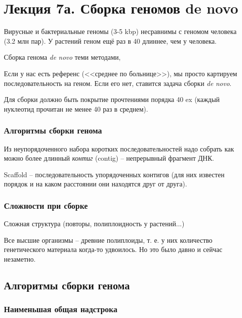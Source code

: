 \documentclass[main.tex]{subfiles}
\begin{document}
\section{Лекция 7а. Сборка геномов de novo}

Вирусные и бактериальные геномы (3-5 kbp) несравнимы с геномом человека (3.2 млн пар).
У растений геном ещё раз в 40 длиннее, чем у человека.

Сборка генома \emph{de novo} теми методами,

Если у нас есть референс (<<среднее по больнице>>), мы просто картируем последовательность на геном.
Если его нет, ставится задача сборки \emph{de novo}.

Для сборки должно быть покрытие прочтениями порядка 40 ex (каждый нуклеотид прочитан не менее 40 раз в среднем). %

\subsubsection{Алгоритмы сборки генома}

Из неупорядоченного набора коротких последовательностей надо собрать как можно более длинный \emph{контиг} (contig) -- непрерывный фрагмент ДНК.

Scaffold -- последовательность упорядоченных контигов (для них известен порядок и на каком расстоянии они находятся друг от друга). %

\subsubsection{Сложности при сборке}
Сложная структура (повторы, полиплоидность у растений...)
\begin{leftbar}
    Все высшие организмы -- древние полиплоиды, т. е. у них количество генетического материала когда-то удвоилось.
    Но это было давно и сейчас незаметно.
\end{leftbar}

\subsection{Алгоритмы сборки генома}

\subsubsection{Наименьшая общая надстрока}
\end{document}
